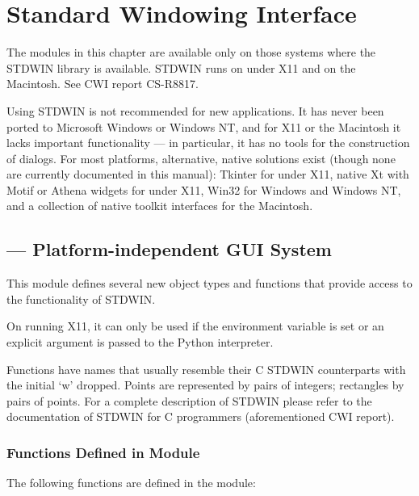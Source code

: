 \chapter{Standard Windowing Interface}

The modules in this chapter are available only on those systems where
the STDWIN library is available.  STDWIN runs on \UNIX{} under X11 and
on the Macintosh.  See CWI report CS-R8817.

 Using STDWIN is not recommended for new
applications.  It has never been ported to Microsoft Windows or
Windows NT, and for X11 or the Macintosh it lacks important
functionality --- in particular, it has no tools for the construction
of dialogs.  For most platforms, alternative, native solutions exist
(though none are currently documented in this manual): Tkinter for
\UNIX{} under X11, native Xt with Motif or Athena widgets for \UNIX{}
under X11, Win32 for Windows and Windows NT, and a collection of
native toolkit interfaces for the Macintosh.


\section{ ---
         Platform-independent GUI System}



This module defines several new object types and functions that
provide access to the functionality of STDWIN.

On \UNIX{} running X11, it can only be used if the 
environment variable is set or an explicit  argument is passed to the Python interpreter.

Functions have names that usually resemble their C STDWIN counterparts
with the initial `w' dropped.
Points are represented by pairs of integers; rectangles
by pairs of points.
For a complete description of STDWIN please refer to the documentation
of STDWIN for C programmers (aforementioned CWI report).

\subsection{Functions Defined in Module }

The following functions are defined in the  module:

